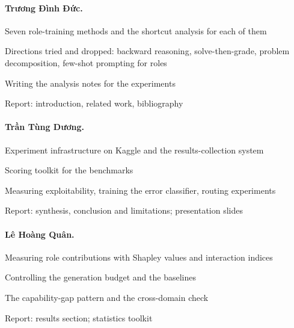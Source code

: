 \documentclass[11pt,a4paper]{article}
\begin{document}
\paragraph{Trương Đình Đức.}
\begin{ddgop}
\item Seven role-training methods and the shortcut analysis for each of them
\item Directions tried and dropped: backward reasoning, solve-then-grade, problem decomposition,
few-shot prompting for roles
\item Writing the analysis notes for the experiments
\item Report: introduction, related work, bibliography
\end{ddgop}

\paragraph{Trần Tùng Dương.}
\begin{ddgop}
\item Experiment infrastructure on Kaggle and the results-collection system
\item Scoring toolkit for the benchmarks
\item Measuring exploitability, training the error classifier, routing experiments
\item Report: synthesis, conclusion and limitations; presentation slides
\end{ddgop}

\paragraph{Lê Hoàng Quân.}
\begin{ddgop}
\item Measuring role contributions with Shapley values and interaction indices
\item Controlling the generation budget and the baselines
\item The capability-gap pattern and the cross-domain check
\item Report: results section; statistics toolkit
\end{ddgop}
\end{document}
